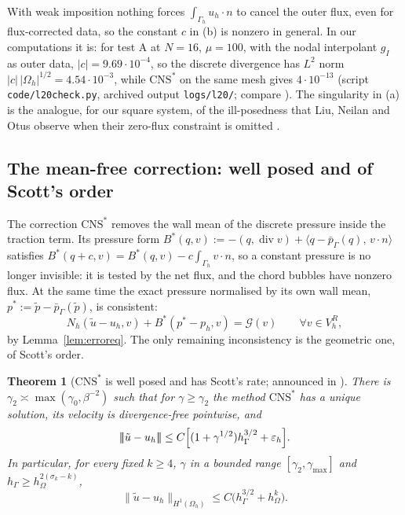 \documentclass[pdflatex,sn-mathphys-num]{sn-jnl}
\theoremstyle{thmstyleone}
\newtheorem{theorem}{Theorem}[section]
\theoremstyle{thmstylethree}
\newcommand{\hG}{h_\Gamma}
\newcommand{\hO}{h_\Omega}
\newcommand{\Gh}{\Gamma_h}
\newcommand{\Oh}{\Omega_h}
\newcommand{\VR}{V_h^R}
\newcommand{\gI}{g_I}
\newcommand{\ut}{\tilde u}
\newcommand{\pt}{\tilde p}
\newcommand{\pbG}{\bar p_{\Gamma}}
\newcommand{\ip}[2]{\langle #1,\, #2\rangle}
\newcommand{\tnorm}[1]{|\!|\!|#1|\!|\!|}
\newcommand{\norm}[1]{\lVert #1\rVert}
\newcommand{\CNS}{\mathrm{CNS}^\ast}
\newcommand{\eps}{\varepsilon_h}
\renewcommand{\div}{\operatorname{div}}
\newcommand{\Gc}{\mathcal G}
\begin{document}
With weak imposition nothing forces $\int_{\Gh}u_h\cdot n$ to cancel the outer flux, even for flux-corrected data, so the constant $c$ in (b) is nonzero in general. In our computations it is: for test A at $N=16$, $\mu=100$, with the nodal interpolant $\gI$ as outer data, $|c|=9.69\cdot10^{-4}$, so the discrete divergence has $L^2$ norm $|c|\,|\Oh|^{1/2}=4.54\cdot10^{-3}$, while $\CNS$ on the same mesh gives $4\cdot10^{-13}$ (script \texttt{code/l20check.py}, archived output \texttt{logs/l20/}; compare \cite[(5.9)]{FrachonNilssonZahedi2024}). The singularity in (a) is the analogue, for our square system, of the ill-posedness that Liu, Neilan and Otus observe when their zero-flux constraint is omitted \cite[Remark~3.2]{LiuNeilanOtus2023}.

\subsection{The mean-free correction: well posed and of Scott's order}
The correction $\CNS$ removes the wall mean of the discrete pressure inside the traction term. Its pressure form $B^\ast(q,v):=-(q,\div v)+\ip{q-\pbG(q)}{v\cdot n}$ satisfies $B^\ast(q+c,v)=B^\ast(q,v)-c\int_{\Gh}v\cdot n$, so a constant pressure is no longer invisible: it is tested by the net flux, and the chord bubbles have nonzero flux. At the same time the exact pressure normalised by its own wall mean, $p^\ast:=\pt-\pbG(\pt)$, is consistent:
\begin{equation}\label{eq:cnserr}
N_h(\ut-u_h,v)+B^\ast(p^\ast-p_h,v)=\Gc(v)\qquad\forall v\in\VR ,
\end{equation}
by Lemma~\ref{lem:erroreq}. The only remaining inconsistency is the geometric one, of Scott's order.

\begin{theorem}[$\CNS$ is well posed and has Scott's rate; announced in {\cite{CavalcantePadhiLetter}}]\label{thm:D}
There is $\gamma_2\asymp\max(\gamma_0,\beta^{-2})$ such that for $\gamma\ge\gamma_2$ the method $\CNS$ has a unique solution, its velocity is divergence-free pointwise, and
\[
\tnorm{\ut-u_h}\le C\Bigl[(1+\gamma^{1/2})\hG^{3/2}+\eps\Bigr].
\]
In particular, for every fixed $k\ge4$, $\gamma$ in a bounded range $[\gamma_2,\gamma_{\max}]$ and $\hG\ge\hO^{2(\sigma_k-k)}$,
\[
\norm{\ut-u_h}_{H^1(\Oh)}\le C\bigl(\hG^{3/2}+\hO^{k}\bigr).
\]
\end{theorem}
\end{document}
